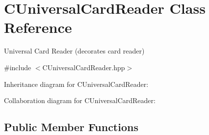 \hypertarget{classCUniversalCardReader}{}\section{C\+Universal\+Card\+Reader Class Reference}
\label{classCUniversalCardReader}


Universal Card Reader (decorates card reader)  




{\ttfamily \#include $<$C\+Universal\+Card\+Reader.\+hpp$>$}



Inheritance diagram for C\+Universal\+Card\+Reader\+:


Collaboration diagram for C\+Universal\+Card\+Reader\+:
\subsection*{Public Member Functions}

